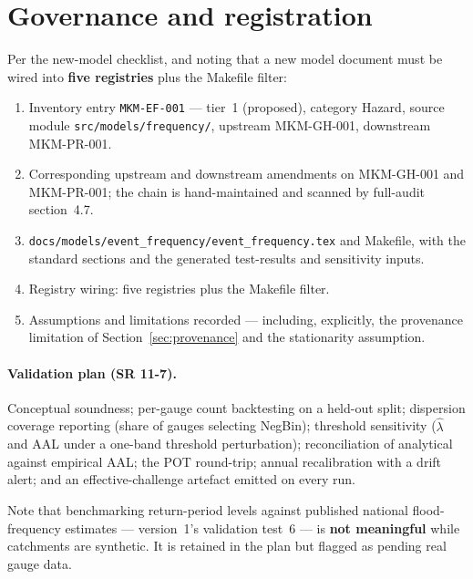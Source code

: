\documentclass[11pt]{article}
\begin{document}
\section{Governance and registration}

Per the new-model checklist, and noting that a new model document must be wired
into \textbf{five registries} plus the Makefile filter:

\begin{enumerate}[nosep]
  \item Inventory entry \texttt{MKM-EF-001} --- tier~1 (proposed), category
        Hazard, source module \texttt{src/models/frequency/}, upstream
        MKM-GH-001, downstream MKM-PR-001.
  \item Corresponding upstream and downstream amendments on MKM-GH-001 and
        MKM-PR-001; the chain is hand-maintained and scanned by full-audit
        section~4.7.
  \item \texttt{docs/models/event\_frequency/event\_frequency.tex} and Makefile,
        with the standard sections and the generated test-results and
        sensitivity inputs.
  \item Registry wiring: five registries plus the Makefile filter.
  \item Assumptions and limitations recorded --- including, explicitly, the
        provenance limitation of Section~\ref{sec:provenance} and the
        stationarity assumption.
\end{enumerate}

\paragraph{Validation plan (SR 11-7).}
Conceptual soundness; per-gauge count backtesting on a held-out split;
dispersion coverage reporting (share of gauges selecting NegBin); threshold
sensitivity ($\hat{\lambda}$ and AAL under a one-band threshold perturbation);
reconciliation of analytical against empirical AAL; the POT round-trip; annual
recalibration with a drift alert; and an effective-challenge artefact emitted on
every run.

Note that benchmarking return-period levels against published national
flood-frequency estimates --- version~1's validation test~6 --- is \textbf{not
meaningful} while catchments are synthetic. It is retained in the plan but
flagged as pending real gauge data.

\end{document}
